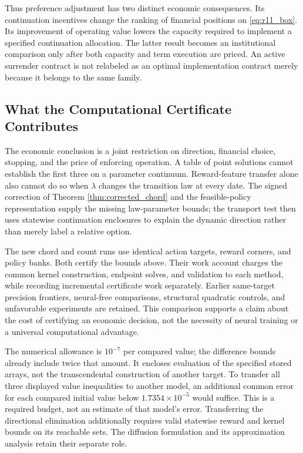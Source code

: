 Thus preference adjustment has two distinct economic consequences. Its continuation incentives change the ranking of financial positions on \eqref{eq:r11_box}. Its improvement of operating value lowers the capacity required to implement a specified continuation allocation. The latter result becomes an institutional comparison only after both capacity and term execution are priced. An active surrender contract is not relabeled as an optimal implementation contract merely because it belongs to the same family.

\subsection{What the Computational Certificate Contributes}
The economic conclusion is a joint restriction on direction, financial choice, stopping, and the price of enforcing operation. A table of point solutions cannot establish the first three on a parameter continuum. Reward-feature transfer alone also cannot do so when $\lambda$ changes the transition law at every date. The signed correction of Theorem \ref{thm:corrected_chord} and the feasible-policy representation supply the missing law-parameter bounds; the transport test then uses statewise continuation enclosures to explain the dynamic direction rather than merely label a relative option.

The new chord and count runs use identical action targets, reward corners, and policy banks. Both certify the bounds above. Their work account charges the common kernel construction, endpoint solves, and validation to each method, while recording incremental certificate work separately. Earlier same-target precision frontiers, neural-free comparisons, structural quadratic controls, and unfavorable experiments are retained. This comparison supports a claim about the cost of certifying an economic decision, not the necessity of neural training or a universal computational advantage.

The numerical allowance is $10^{-7}$ per compared value; the difference bounds already include twice that amount. It encloses evaluation of the specified stored arrays, not the transcendental construction of another target. To transfer all three displayed value inequalities to another model, an additional common error for each compared initial value below $1.7354\times10^{-5}$ would suffice. This is a required budget, not an estimate of that model's error. Transferring the directional elimination additionally requires valid statewise reward and kernel bounds on its reachable sets. The diffusion formulation and its approximation analysis retain their separate role.
